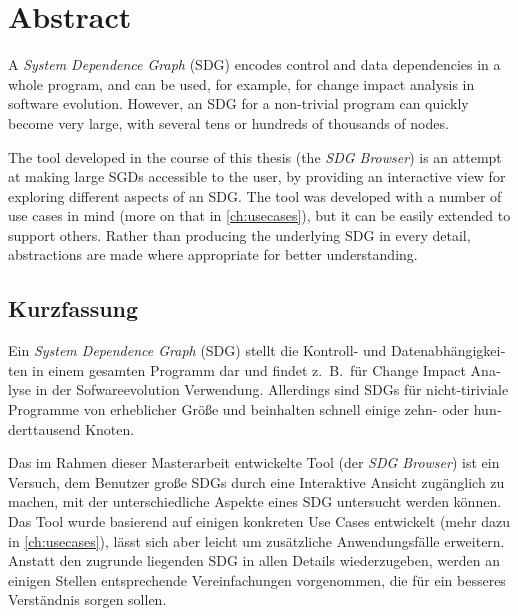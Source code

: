\chapter*{Abstract} \vspace{-0.5cm}

A \emph{System Dependence Graph} (SDG) encodes control and data dependencies in a whole program, and can be used, for 
example, for change impact analysis in software evolution. However, an SDG for a non-trivial program can quickly become 
very large, with several tens or hundreds of thousands of nodes.

The tool developed in the course of this thesis (the \emph{SDG Browser}) is an attempt at making large SGDs accessible 
to the user, by providing an interactive view for exploring different aspects of an SDG. The tool was developed with a 
number of use cases in mind (more on that in \autoref{ch:usecases}), but it can be easily extended to support others. 
Rather than producing the underlying SDG in every detail, abstractions are made where appropriate for better 
understanding.


\begin{otherlanguage}{ngerman}
\begingroup
\let\clearpage\relax
\chapter*{Kurzfassung} \vspace{-0.5cm}
\endgroup

Ein \emph{System Dependence Graph} (SDG) stellt die Kontroll- und Datenabhängigkeiten in einem gesamten Programm dar 
und findet z.\ B.\ für Change Impact Analyse in der Sofwareevolution Verwendung. Allerdings sind SDGs für 
nicht-tiriviale Programme von erheblicher Größe und beinhalten schnell einige zehn- oder hunderttausend Knoten.

Das im Rahmen dieser Masterarbeit entwickelte Tool (der \emph{SDG Browser}) ist ein Versuch, dem Benutzer große SDGs 
durch eine Interaktive Ansicht zugänglich zu machen, mit der unterschiedliche Aspekte eines SDG untersucht werden 
können. Das Tool wurde basierend auf einigen konkreten Use Cases entwickelt (mehr dazu in \autoref{ch:usecases}), 
lässt sich aber leicht um zusätzliche Anwendungsfälle erweitern. Anstatt den zugrunde liegenden SDG in allen Details 
wiederzugeben, werden an einigen Stellen entsprechende Vereinfachungen vorgenommen, die für ein besseres Verständnis 
sorgen sollen.

\end{otherlanguage}
